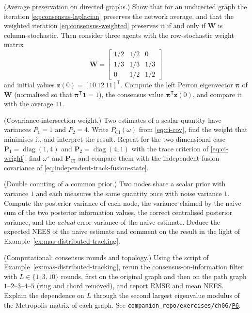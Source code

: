 \documentclass[graybox,envcountchap]{style/SNmono}
\DeclareMathOperator{\diag}{diag}
\newcommand{\repopath}[1]{\texttt{#1}}
\providecommand{\DIFadd}[1]{{\protect\color{blue} #1}} %
\providecommand{\DIFdel}[1]{{\protect\color{red} #1}} %
\DeclareRobustCommand{\RtwoDel}[1]{{\color{red}%
  \renewcommand{\DIFadd}[1]{##1}\renewcommand{\DIFdel}[1]{##1}%
  #1}}
\DeclareRobustCommand{\RtwoAdd}[1]{{\color{blue}#1}}
\DeclareRobustCommand{\codeentry}[1]{\hyperref[code:#1]{\texttt{#1}}}
\begin{document}
\begin{prob}\label{prob:ch06:2}
(Average preservation on directed graphs.) Show that for an undirected graph the iteration \eqref{eq:consensus-laplacian} preserves the network average, and that the weighted iteration \eqref{eq:consensus-weighted} preserves it if and only if $\mathbf{W}$ is column-stochastic. Then consider three agents with the row-stochastic weight matrix
\begin{equation*}
\mathbf{W}=\begin{bmatrix}1/2&1/2&0\\ 1/3&1/3&1/3\\ 0&1/2&1/2\end{bmatrix}
\end{equation*}
and initial values $\mathbf{z}(0)=[10\ 12\ 11]^{\mathsf T}$. Compute the left Perron eigenvector $\boldsymbol{\pi}$ of $\mathbf{W}$ (normalised so that $\boldsymbol{\pi}^{\mathsf T}\mathbf{1}=1$), the consensus value $\boldsymbol{\pi}^{\mathsf T}\mathbf{z}(0)$, and compare it with the average $11$.
\end{prob}

\begin{prob}\label{prob:ch06:3}
(Covariance-intersection weight.) Two estimates of a scalar quantity have variances $P_1=1$ and $P_2=4$. Write $P_{\mathrm{CI}}(\omega)$ from \eqref{eq:ci-cov}, find the weight that minimises it, and interpret the result. Repeat for the two-dimensional case $\mathbf{P}_1=\diag(1,4)$ and $\mathbf{P}_2=\diag(4,1)$ with the trace criterion of \eqref{eq:ci-weight}: find $\omega^{\star}$ and $\mathbf{P}_{\mathrm{CI}}$ and compare them with the independent-fusion covariance of \eqref{eq:independent-track-fusion-state}.
\end{prob}

\begin{prob}\label{prob:ch06:4}
(Double counting of a common prior.) Two nodes share a scalar prior with variance $1$ and each measures the same quantity once with noise variance $1$. Compute the posterior variance of each node, the variance claimed by the naive sum of the two posterior information values, the correct centralised posterior variance, and the \emph{actual} error variance of the naive estimate. Deduce the expected NEES of the naive estimate and comment on the result in the light of Example~\ref{ex:mas-distributed-tracking}.
\end{prob}

\begin{prob}\label{prob:ch06:5}
(Computational: consensus rounds and topology.) Using the script of Example~\ref{ex:mas-distributed-tracking}, rerun the consensus-on-information filter with $L\in\{1,3,10\}$ rounds, first on the original graph and then on the path graph $1$--$2$--$3$--$4$--$5$ (ring and chord removed), and report RMSE and mean NEES. Explain the dependence on $L$ through the second largest eigenvalue modulus of the Metropolis matrix of each graph. See \RtwoDel{\repopath{companion\_\allowbreak repo/\allowbreak exercises/\allowbreak ch06/\allowbreak }}\RtwoAdd{\codeentry{P6}}.
\end{prob}
\end{document}
